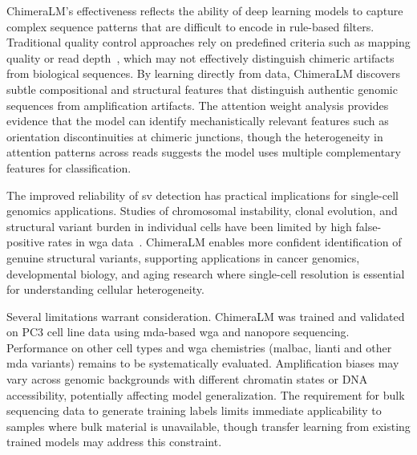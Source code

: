 \documentclass[pdflatex,sn-nature,lineno]{sn-jnl}%
\theoremstyle{thmstyleone}%
\theoremstyle{thmstyletwo}%
\theoremstyle{thmstylethree}%
\begin{document}
ChimeraLM's effectiveness reflects the ability of deep learning models to capture complex sequence patterns that are difficult to encode in rule-based filters. Traditional quality control approaches rely on predefined criteria such as mapping quality or read depth~\cite{kiguchi2021longread, lu2023exploration}, which may not effectively distinguish chimeric artifacts from biological sequences. By learning directly from data, ChimeraLM discovers subtle compositional and structural features that distinguish authentic genomic sequences from amplification artifacts. The attention weight analysis provides evidence that the model can identify mechanistically relevant features such as orientation discontinuities at chimeric junctions, though the heterogeneity in attention patterns across reads suggests the model uses multiple complementary features for classification.

The improved reliability of \gls{sv} detection has practical implications for single-cell genomics applications. Studies of chromosomal instability, clonal evolution, and structural variant burden in individual cells have been limited by high false-positive rates in \gls{wga} data~\cite{kosugi2019comprehensive, mahmoud2019structural}. ChimeraLM enables more confident identification of genuine structural variants, supporting applications in cancer genomics, developmental biology, and aging research where single-cell resolution is essential for understanding cellular heterogeneity.

Several limitations warrant consideration.
ChimeraLM was trained and validated on PC3 cell line data using \gls{mda}-based \gls{wga} and nanopore sequencing. 
Performance on other cell types and \gls{wga} chemistries (\gls{malbac}, \gls{lianti} and other \gls{mda} variants) remains to be systematically evaluated. 
Amplification biases may vary across genomic backgrounds with different chromatin states or DNA accessibility, potentially affecting model generalization. 
The requirement for bulk sequencing data to generate training labels limits immediate applicability to samples where bulk material is unavailable, though transfer learning from existing trained models may address this constraint.

\end{document}
